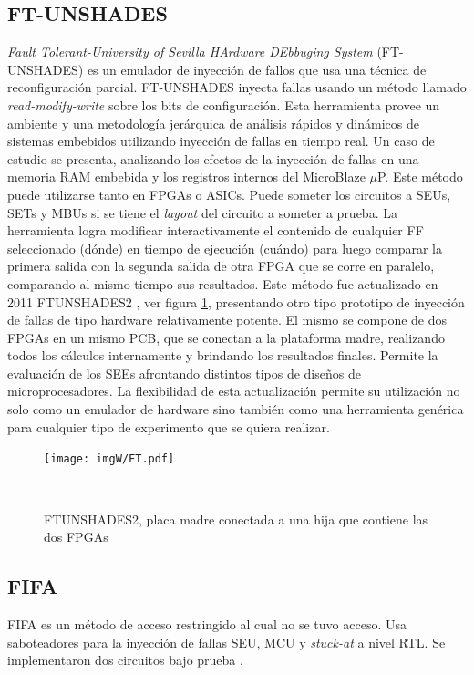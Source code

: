 \documentclass[a4paper,openright,12pt]{report}
\begin{document}
\subsection{FT-UNSHADES} 
\textit{Fault Tolerant-University of Sevilla HArdware DEbbuging System} \linebreak
(FT-UNSHADES) \cite{Guzman2008} es un emulador de inyección de fallos que usa una técnica de reconfiguración parcial. FT-UNSHADES inyecta fallas usando un método llamado \textit{read-modify-write} sobre los bits de configuración. Esta herramienta provee un ambiente y una metodología jerárquica de  análisis rápidos y dinámicos de sistemas embebidos utilizando inyección de fallas en tiempo real. Un caso de estudio se presenta, analizando los efectos de la inyección de fallas en una memoria RAM embebida y los registros internos del MicroBlaze $\mu$P. Este método puede utilizarse tanto en FPGAs o ASICs.
Puede someter los circuitos a SEUs, SETs y MBUs si se tiene el \textit{layout} del circuito a someter a prueba.
La herramienta logra modificar interactivamente el contenido de cualquier FF  seleccionado (dónde) en tiempo de ejecución (cuándo) para luego comparar la primera salida con la segunda salida de otra FPGA que se corre en paralelo, comparando al mismo  tiempo sus resultados.
Este método fue actualizado en 2011 FTUNSHADES2 \cite{6131392}, ver figura \ref{FT-UNSHADES}, presentando otro tipo prototipo de inyección de fallas de tipo hardware relativamente potente. El mismo se compone de dos FPGAs en un mismo PCB, que se conectan a la plataforma madre, realizando todos los cálculos internamente y brindando los resultados finales. Permite la evaluación de  los SEEs afrontando distintos tipos de diseños de microprocesadores. La flexibilidad de esta actualización permite su  utilización no solo como un emulador de hardware sino también como una herramienta genérica para cualquier tipo de experimento que se quiera realizar.


\begin{figure}[H]
	\centering
	\texttt{[image: imgW/FT.pdf]}
	\caption{FTUNSHADES2, placa madre conectada a una hija que contiene las dos FPGAs}
     ~\cite{6131392}
	\label{FT-UNSHADES}
\end{figure}



\subsection{FIFA}
FIFA
\cite{naviner2011fifa} es un método  de acceso restringido al cual no se tuvo acceso.  Usa saboteadores para la inyección de fallas SEU, MCU y \textit{stuck-at} a nivel RTL. Se implementaron dos circuitos bajo prueba .
\end{document}
